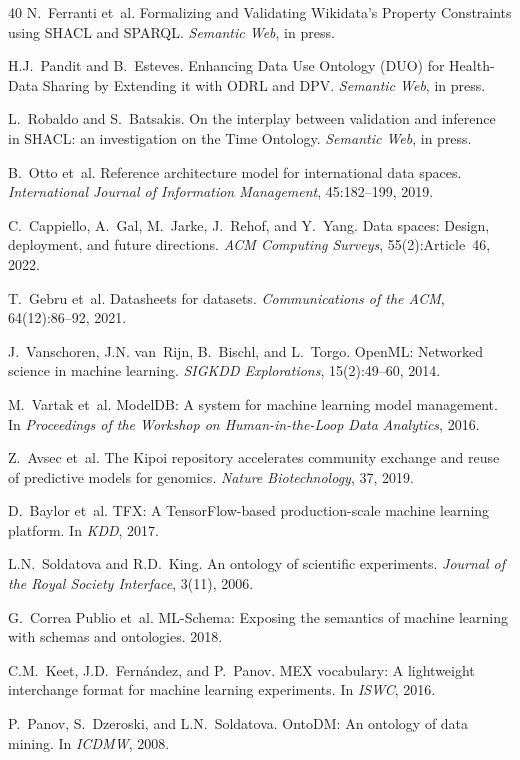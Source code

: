 \documentclass[11pt,a4paper]{article}
\begin{document}
\begin{thebibliography}{40}
 N.~Ferranti et~al. Formalizing and Validating Wikidata's Property Constraints using SHACL and SPARQL. \emph{Semantic Web}, in press.

 H.J.~Pandit and B.~Esteves. Enhancing Data Use Ontology (DUO) for Health-Data Sharing by Extending it with ODRL and DPV. \emph{Semantic Web}, in press.

 L.~Robaldo and S.~Batsakis. On the interplay between validation and inference in SHACL: an investigation on the Time Ontology. \emph{Semantic Web}, in press.

 B.~Otto et~al. Reference architecture model for international data spaces. \emph{International Journal of Information Management}, 45:182--199, 2019.

 C.~Cappiello, A.~Gal, M.~Jarke, J.~Rehof, and Y.~Yang. Data spaces: Design, deployment, and future directions. \emph{ACM Computing Surveys}, 55(2):Article~46, 2022.

 T.~Gebru et~al. Datasheets for datasets. \emph{Communications of the ACM}, 64(12):86--92, 2021.

 J.~Vanschoren, J.N. van~Rijn, B.~Bischl, and L.~Torgo. OpenML: Networked science in machine learning. \emph{SIGKDD Explorations}, 15(2):49--60, 2014.

 M.~Vartak et~al. ModelDB: A system for machine learning model management. In \emph{Proceedings of the Workshop on Human-in-the-Loop Data Analytics}, 2016.

 Z.~Avsec et~al. The Kipoi repository accelerates community exchange and reuse of predictive models for genomics. \emph{Nature Biotechnology}, 37, 2019.

 D.~Baylor et~al. TFX: A TensorFlow-based production-scale machine learning platform. In \emph{KDD}, 2017.

 L.N.~Soldatova and R.D.~King. An ontology of scientific experiments. \emph{Journal of the Royal Society Interface}, 3(11), 2006.

 G.~Correa Publio et~al. ML-Schema: Exposing the semantics of machine learning with schemas and ontologies. 2018.

 C.M.~Keet, J.D.~Fernández, and P.~Panov. MEX vocabulary: A lightweight interchange format for machine learning experiments. In \emph{ISWC}, 2016.

 P.~Panov, S.~Dzeroski, and L.N.~Soldatova. OntoDM: An ontology of data mining. In \emph{ICDMW}, 2008.


\end{thebibliography}
\end{document}
